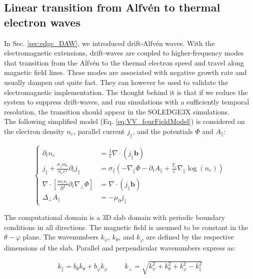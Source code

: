 \subsection{Linear transition from Alfvén to thermal electron waves}

In Sec. \ref{sec:edge_DAW}, we introduced drift-Alfvén waves. With the electromagnetic extensions, drift-waves are coupled to higher-frequency modes that transition from the Alfvén to the thermal electron speed and travel along magnetic field lines. These modes are associated with negative growth rate and usually dampen out quite fast. They can however be used to validate the electromagnetic implementation. The thought behind it is that if we reduce the system to suppress drift-waves, and run simulations with a sufficiently temporal resolution, the transition should appear in the SOLEDGE3X simulations. \\

The following simplified model (Eq. \ref{eq:VV_fourFieldModel}) is considered on the electron density $n_e$, parallel current $j_\parallel$, and the potentials $\Phi$ and $A_\parallel$: \newline

\begin{equation}
	\left\{
	\begin{aligned}
		\partial_t n_e &= \frac{1}{e}\nabla \cdot (j_\parallel \mathbf{b}) \\
		j_\parallel + \frac{\sigma_\parallel m_e}{n_e e^2} \partial_t j_\parallel  &= \sigma_\parallel \left( -\nabla_\parallel \Phi - \partial_t A_\parallel + \frac{T_e}{e} \nabla_\parallel \log(n_e) \right) \\
		\nabla \cdot \left[ \frac{m_i n_i}{B^2} \partial_t \nabla_\perp \Phi \right] &= \nabla \cdot (j_\parallel \mathbf{b}) \\
		\Delta_\perp A_\parallel &= -\mu_0 j_\parallel 
	\end{aligned}
	\right.
	\label{eq:VV_fourFieldModel}
\end{equation}

The computational domain is a 3D slab domain with periodic boundary conditions in all directions. The magnetic field is assumed to be constant in the $\theta-\varphi$ plane. The wavenumbers $k_\psi$, $k_\theta$, and $k_\varphi$ are defined by the respective dimensions of the slab. Parallel and perpendicular wavenumbers express as: \newline

\begin{align}
	k_\parallel = b_\theta k_\theta + b_\varphi k_\varphi &&& k_\perp = \sqrt{k_\psi^2 + k_\theta^2 + k_\varphi^2 - k_\parallel^2}
\end{align}

